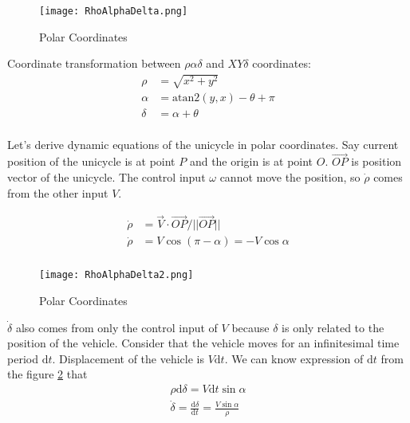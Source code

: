 ﻿\documentclass[twoside]{article}
\begin{document}
\begin{figure}[h]
\centering
\texttt{[image: RhoAlphaDelta.png]}
\caption{Polar Coordinates}
\label{RhoAlphaDeltaFigure}
\end{figure}

Coordinate transformation between $\rho\alpha\delta$ and $XY\delta$ coordinates:
\begin{equation} \label{coordinate transformation}
\begin{split}
\rho &= \sqrt{x^2+y^2} \\
\alpha &= \mathrm{atan2}(y, x) - \theta + \pi \\
\delta &= \alpha + \theta \\
\end{split}
\end{equation}

Let's derive dynamic equations of the unicycle in polar coordinates. Say current position of the unicycle is at point $P$ and the origin is at point $O$. $\overrightarrow{OP}$ is position vector of the unicycle. The control input $\omega$ cannot move the position, so $\dot{\rho}$ comes from the other input $V$.

\begin{equation} \label{dotrho}
\begin{split}
\dot{\rho} &= \vec{V} \cdot \overrightarrow{OP}/||\overrightarrow{OP}|| \\
\dot{\rho} &= V \cos(\pi - \alpha) = -V \cos\alpha \\
\end{split}
\end{equation}

\begin{figure}[h]
\centering
\texttt{[image: RhoAlphaDelta2.png]}
\caption{Polar Coordinates}
\label{RhoAlphaDeltaFigure2}
\end{figure}

$\dot{\delta}$ also comes from only the control input of $V$ because $\delta$ is only related to the position of the vehicle. Consider that the vehicle moves for an infinitesimal time period $\mathrm{d}t$. Displacement of the vehicle is $V\mathrm{d}t$. We can know expression of $\mathrm{d}t$ from the figure \ref{RhoAlphaDeltaFigure2} that
\begin{equation} \label{dotdelta}
\begin{split}
\rho \mathrm{d}\delta = V \mathrm{d}t \sin\alpha \\
\dot{\delta} = \frac{\mathrm{d}\delta}{\mathrm{d}t}=\frac{V \sin\alpha}{\rho}  \\
\end{split}
\end{equation}
\end{document}
